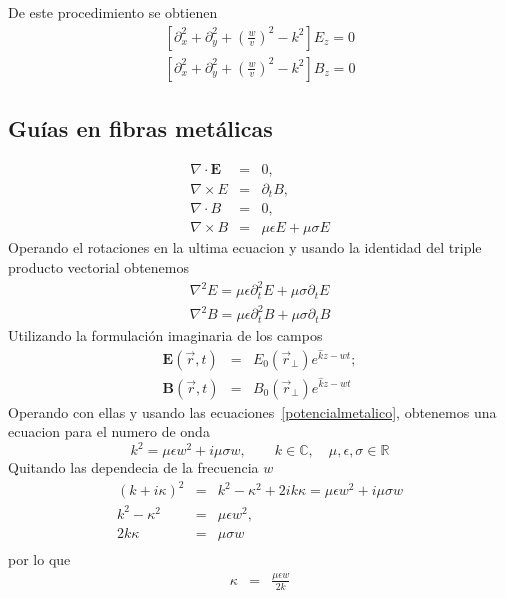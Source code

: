 De este procedimiento se obtienen  
\begin{subequations}\label{Helmholtz}
	\begin{align}
	[\partial_{x}^2+\partial_{y}^2+(\frac{w}{v})^2-k^2] E_{z}=0\\
	[\partial_{x}^2+\partial_{y}^2+(\frac{w}{v})^2-k^2] B_{z}=0
	\end{align}
\end{subequations}
\subsection{Guías en fibras metálicas}
\begin{subequations} \label{mawxellmetalicas}
	\begin{eqnarray}
	\nabla \cdot \mathbf{E} &=& 0 ,\\
	\nabla \times E &=& \partial_{t}B, \\
	\nabla \cdot B &=& 0, \\ 
	\nabla \times B &=& \mu \epsilon E + \mu \sigma E  
	\end{eqnarray}
\end{subequations}
Operando el rotaciones en la ultima ecuacion y usando la identidad del triple producto vectorial obtenemos
\begin{subequations}\label{potencialmetalico}
	\begin{align}
	\nabla^2 E=\mu \epsilon \partial_{t}^2E+\mu\sigma \partial_{t} E \\
	\nabla^2 B=\mu \epsilon \partial_{t}^2B+\mu\sigma \partial_{t} B 
	\end{align}
\end{subequations}
Utilizando la formulación imaginaria de los campos
\begin{eqnarray}
\mathbf{E}(\vec{r},t) &=& E_{0}(\vec{r}_{\perp}) e^{\hat{k}z-wt} ; \\
\mathbf{B}(\vec{r},t) &=& B_{0}(\vec{r}_{\perp}) e^{\hat{k}z-wt} 
\end{eqnarray}
Operando con ellas y usando las ecuaciones~\ref{potencialmetalico}, obtenemos una ecuacion para
el numero de onda
\begin{equation}
k^2=\mu \epsilon w^2 + i \mu \sigma w, \qquad k \in \mathbb{C}, \quad \mu, \epsilon, \sigma \in \mathbb{R}
\end{equation}
Quitando las dependecia de la frecuencia $w$ 
\begin{subequations}
	\begin{eqnarray}
	(k+i\kappa)^2 &=& k^2-\kappa^2+2ik\kappa=\mu\epsilon w^2+i\mu\sigma w \nonumber \\
	k^2 - \kappa^2 &=& \mu \epsilon w^2, \\ 
	2 k \kappa &=& \mu \sigma w \nonumber \\
	\end{eqnarray}
\end{subequations}
por lo que 
\begin{eqnarray}
\kappa &=& \frac{\mu \epsilon w}{2 k}
\end{eqnarray}


